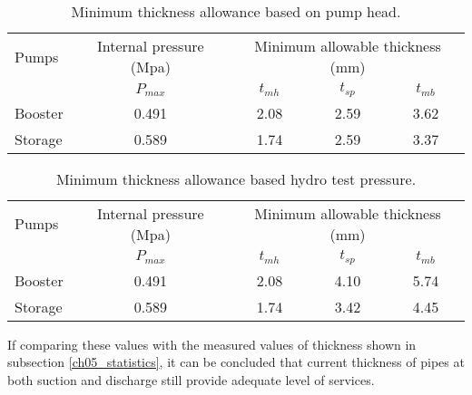 \begin{table}[h]
	\caption{Minimum thickness allowance based on pump head.}
	\label{ch05_tbl_thicknesscalcresultpumphead}

	{\footnotesize
		\begin{tabular}{l|l|p{3cm}|p{3cm}|p{3cm}}
			\hline
Pumps & \multicolumn{1}{c|}{Internal pressure  (Mpa)} & \multicolumn{3}{c}{Minimum allowable thickness (mm)} \\ 
\cline{3-5}
& \multicolumn{1}{c|}{$P_{max}$} & \multicolumn{1}{c|}{$t_{mh}$} & \multicolumn{1}{c|}{$t_{sp}$} & \multicolumn{1}{c}{$t_{mb}$} \\ 
\hline
Booster & \multicolumn{1}{c|}{0.491} & \multicolumn{1}{c|}{2.08} & \multicolumn{1}{c|}{2.59} & \multicolumn{1}{c}{3.62} \\ 
Storage & \multicolumn{1}{c|}{0.589} & \multicolumn{1}{c|}{1.74} & \multicolumn{1}{c|}{2.59} & \multicolumn{1}{c}{3.37} \\ 
			\hline
		\end{tabular}
	}
	
\end{table}


\begin{table}[h]
	\caption{Minimum thickness allowance based hydro test pressure.}
	\label{ch05_tbl_thicknesscalcresulthydro}

		{\footnotesize
			\begin{tabular}{l|l|p{3cm}|p{3cm}|p{3cm}}
				\hline
Pumps & \multicolumn{1}{c|}{Internal pressure  (Mpa)} & \multicolumn{3}{c}{Minimum allowable thickness (mm)} \\ 
\cline{3-5}
& \multicolumn{1}{c|}{$P_{max}$} & \multicolumn{1}{c|}{$t_{mh}$} & \multicolumn{1}{c|}{$t_{sp}$} & \multicolumn{1}{c}{$t_{mb}$} \\ 
\hline
Booster & \multicolumn{1}{c|}{0.491} & \multicolumn{1}{c|}{2.08} & \multicolumn{1}{c|}{4.10} & \multicolumn{1}{c}{5.74} \\ 
Storage & \multicolumn{1}{c|}{0.589} & \multicolumn{1}{c|}{1.74} & \multicolumn{1}{c|}{3.42} & \multicolumn{1}{c}{4.45} \\ 
\hline
			\end{tabular}
		}
\end{table}



If comparing these values with the measured values of thickness shown in subsection \ref{ch05_statistics}, it can be concluded that current thickness of pipes at both suction and discharge still provide adequate level of services.%

